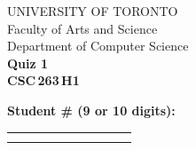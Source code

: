 \documentclass[12pt]{article}
\begin{document}
\newcommand{\spacer}[]{
  \vspace{5mm}\\
}

\newcommand{\hspacer}[]{\\
}

\begin{center}\large
  UNIVERSITY OF TORONTO\\
  Faculty of Arts and Science\\[1.75ex]
  Department of Computer Science\\[1.75ex]
  \textbf{Quiz 1} \\
  \textbf{{CSC\,263\,H1}}
\end{center}


\noindent \textbf{Student \# (9 or 10 digits):} \begin{table}[H]
    \begin{tabular}{|c|c|c|c|c|c|c|c|c|c|}
      \hline
      \hspace{1.2em}\; & \hspace{1.2em}\; & \hspace{1.2em}\; & \hspace{1.2em}\; & \hspace{1.2em}\; & \hspace{1.2em}\; & \hspace{1.2em}\; & \hspace{1.2em}\; & \hspace{1.2em}\; & \hspace{1.2em}\; \\
      \hspace{1.2em}\; & \hspace{1.2em}\; & \hspace{1.2em}\; & \hspace{1.2em}\; & \hspace{1.2em}\; & \hspace{1.2em}\; & \hspace{1.2em}\; & \hspace{1.2em}\; & \hspace{1.2em}\; & \hspace{1.2em}\;\\\hline
    \end{tabular}%
  \end{table}
\end{document}
